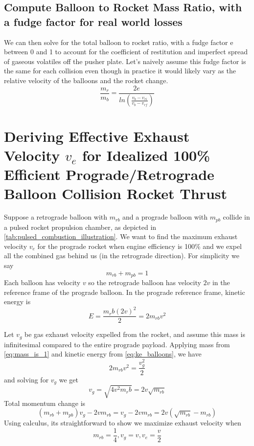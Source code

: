 \documentclass{article}
\begin{document}
\subsection{Compute Balloon to Rocket Mass Ratio, with a fudge factor for real world losses}

We can then solve for the total balloon to rocket ratio, with a fudge factor e between 0 and 1 to account for the coefficient of restitution and imperfect spread of gaseous volatiles off the pusher plate.   Let's naively assume this fudge factor is the same for each collision even though in practice it would likely vary as the relative velocity of the balloons and the rocket change.
\begin{equation}
\frac{m_r}{m_b} = \frac{2e}{ln(\frac{v_b-v_{ri}}{v_b-v_{rf}})}\label{eq:balloon_ratio}
\end{equation}

\section{Deriving Effective Exhaust Velocity $v_e$ for Idealized 100\% Efficient Prograde/Retrograde Balloon Collision Rocket Thrust}\label{sec:dv_effective}
Suppose a retrograde balloon with $m_{rb}$ and a prograde balloon with $m_{pb}$ collide in a pulsed rocket propulsion chamber, as depicted in \autoref{tab:pulsed_combustion_illustration}.  We want to find the maximum exhaust velocity $v_e$ for the prograde rocket  when engine efficiency is 100\% and we expel all the combined gas behind us (in the retrograde direction).   For simplicity we say 
\begin{equation}
m_{rb} + m_{pb} = 1\label{eq:mass_is_1}
\end{equation} 
Each balloon has velocity $v$ so the retrograde balloon has velocity $2v$ in the reference frame of the prograde balloon.   In the prograde reference frame, kinetic energy is
\begin{equation}
E = \frac{m_rb (2v)^2}{2} = 2m_{rb}v^2\label{eq:ke_balloons}
\end{equation}

Let $v_g$ be gas exhaust velocity expelled from the rocket, and assume this mass is infinitesimal compared to the entire prograde payload.  Applying mass from \autoref{eq:mass_is_1}
 and kinetic energy from \autoref{eq:ke_balloons}, we have 
 \begin{equation}
 2m_{rb}v^2= \frac{v_g^2}{2}
 \end{equation}
 and solving for $v_g$ we get 
 \begin{equation}
 v_g = \sqrt{4v^2m_rb} = 2v\sqrt{m_{rb}} \label{eq:vg_result}
 \end{equation}
 Total momentum change is 
 \[(m_{rb} + m_{pb})v_g - 2vm_{rb} = v_g-2vm_{rb} = 2v(\sqrt{m_{rb}} - m_{rb}) \]
 Using calculus, its straightforward to show we maximize exhaust velocity when 
 \begin{equation}
 m_{rb} = \frac{1}{4}, \label{eq:max_m_rb}
 v_g = v,
 v_e= \frac{v}{2}
 \end{equation}
 
  
  
\end{document}
